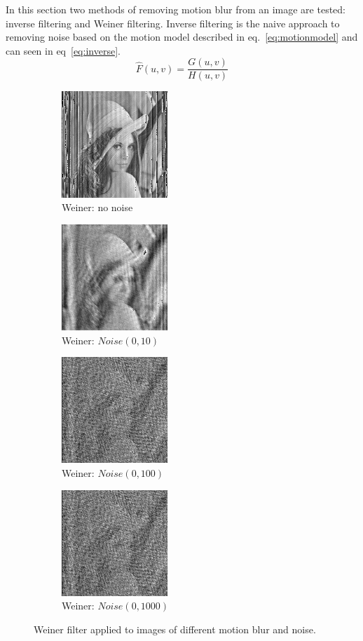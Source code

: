 \documentclass[letterpaper]{article}
\begin{document}
In this section two methods of removing motion blur from an image are tested: inverse filtering and Weiner filtering. Inverse filtering is the naive approach to removing noise based on the motion model described in eq.~\ref{eq:motionmodel} and can seen in eq~\ref{eq:inverse}.
\begin{equation} \label{eq:inverse}
\hat{F}(u,v)=\frac{G(u,v)}{H(u,v)}
\end{equation}
\begin{figure}[hbtp]
  \centering
  \begin{subfigure}{4cm}
    \includegraphics[width=4cm]{images/lenna_deblur_0015.png}
    \caption{Weiner: no noise}
  \end{subfigure}
  \begin{subfigure}{4cm}
    \includegraphics[width=4cm]{images/lenna_deblurred_weiner_10.png}
    \caption{Weiner: $Noise(0,10)$}
  \end{subfigure}
  \begin{subfigure}{4cm}
    \includegraphics[width=4cm]{images/lenna_deblurred_weiner_100.png}
    \caption{Weiner: $Noise(0,100)$}
  \end{subfigure}
  \begin{subfigure}{4cm}
    \includegraphics[width=4cm]{images/lenna_deblurred_weiner_100.png}
    \caption{Weiner: $Noise(0,1000)$}
  \end{subfigure}
  \caption{Weiner filter applied to images of different motion blur and noise.}
  \label{fig:weiner}
\end{figure}
\end{document}
